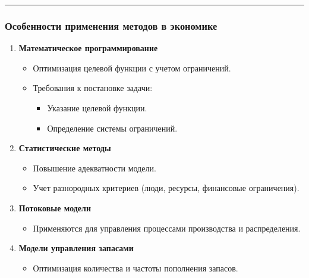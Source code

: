 \documentclass[
]{article}
\providecommand{\tightlist}{%
  \setlength{\itemsep}{0pt}\setlength{\parskip}{0pt}}
\begin{document}
\begin{center}\rule{0.5\linewidth}{0.5pt}\end{center}

\subsubsection{\texorpdfstring{\textbf{Особенности применения методов в
экономике}}{Особенности применения методов в экономике}}\label{ux43eux441ux43eux431ux435ux43dux43dux43eux441ux442ux438-ux43fux440ux438ux43cux435ux43dux435ux43dux438ux44f-ux43cux435ux442ux43eux434ux43eux432-ux432-ux44dux43aux43eux43dux43eux43cux438ux43aux435}

\begin{enumerate}
\def\labelenumi{\arabic{enumi}.}
\item
  \textbf{Математическое программирование}

  \begin{itemize}
  \tightlist
  \item
    Оптимизация целевой функции с учетом ограничений.
  \item
    Требования к постановке задачи:

    \begin{itemize}
    \tightlist
    \item
      Указание целевой функции.
    \item
      Определение системы ограничений.
    \end{itemize}
  \end{itemize}
\item
  \textbf{Статистические методы}

  \begin{itemize}
  \tightlist
  \item
    Повышение адекватности модели.
  \item
    Учет разнородных критериев (люди, ресурсы, финансовые ограничения).
  \end{itemize}
\item
  \textbf{Потоковые модели}

  \begin{itemize}
  \tightlist
  \item
    Применяются для управления процессами производства и распределения.
  \end{itemize}
\item
  \textbf{Модели управления запасами}

  \begin{itemize}
  \tightlist
  \item
    Оптимизация количества и частоты пополнения запасов.
  \end{itemize}
\end{enumerate}
\end{document}
